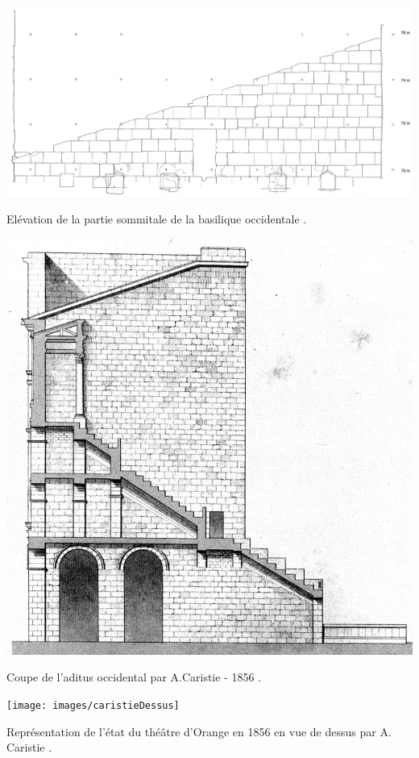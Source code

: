 \begin{figureth}
	\includegraphics[width=\linewidth]{images/grenierOcci}
	\caption[Elévation de la partie sommitale de la basilique occidentale.]{Elévation de la partie sommitale de la basilique occidentale \footnotemark.}
	\label{grenier} 
\end{figureth}
\begin{figureth}
	\includegraphics[width=0.6\linewidth]{images/colonneCaristie}
	\caption[Coupe de l'\gls{aditus} occidental par A.Caristie - 1856.]{Coupe de l'\gls{aditus} occidental par A.Caristie - 1856 \footnotemark.}
	\label{colonneCaristie} 
\end{figureth}


\begin{figureth}
	\texttt{[image: images/caristieDessus]}
	\caption[Vue de dessus par A. Caristie 1856.]{Représentation de l'état du théâtre d'Orange en 1856 en vue de dessus par A. Caristie \footnotemark.} 
	\label{caristieDessus} 
\end{figureth}

